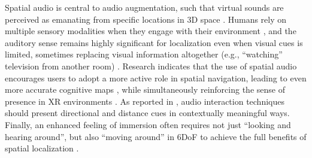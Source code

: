 Spatial audio is central to audio augmentation, such that virtual sounds are perceived as emanating from specific locations in 3D space \cite{Ruminski2015}. Humans rely on multiple sensory modalities when they engage with their environment \cite{new_ears_2024, metatla2016tap, kari2023scene}, and the auditory sense remains highly significant for localization even when visual cues is limited, sometimes replacing visual information altogether (e.g., \enquote{watching} television from another room) \cite{correa2023spatial, nonspeech1994}. Research indicates that the use of spatial audio encourages users to adopt a more active role in spatial navigation, leading to even more accurate cognitive maps \cite{Clemenson2021}, while simultaneously reinforcing the sense of presence in XR environments \cite{Kern2020-nh}. As reported in \cite{new_ears_2024}, audio interaction techniques should present directional and distance cues in contextually meaningful ways. Finally, an enhanced feeling of immersion often requires not just \enquote{looking and hearing around}, but also \enquote{moving around} in 6DoF to achieve the full benefits of spatial localization \cite{farnell2010designing}.


